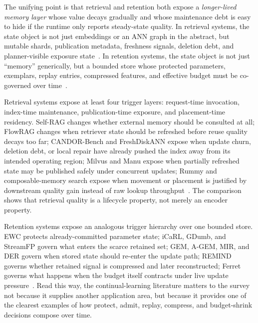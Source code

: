 The unifying point is that retrieval and retention both expose a \emph{longer-lived memory layer} whose value decays gradually and whose maintenance debt is easy to hide if the runtime only reports steady-state quality. In retrieval systems, the state object is not just embeddings or an ANN graph in the abstract, but mutable shards, publication metadata, freshness signals, deletion debt, and planner-visible exposure state~\cite{singh2021freshdiskann,wang2021milvus,guo2022manu,asai2024selfrag,zhang2026flowrag,wang2026candor}. In retention systems, the state object is not just ``memory'' generically, but a bounded store whose protected parameters, exemplars, replay entries, compressed features, and effective budget must be co-governed over time~\cite{kirkpatrick2017ewc,rebuffi2017icarl,aljundi2019mir,prabhu2020gdumb,hayes2020remind,zhou2025ferret,li2026streamfp}.

Retrieval systems expose at least four trigger layers: request-time invocation, index-time maintenance, publication-time exposure, and placement-time residency. Self-RAG changes whether external memory should be consulted at all; FlowRAG changes when retriever state should be refreshed before reuse quality decays too far; CANDOR-Bench and FreshDiskANN expose when update churn, deletion debt, or local repair have already pushed the index away from its intended operating region; Milvus and Manu expose when partially refreshed state may be published safely under concurrent updates; Rummy and composable-memory search expose when movement or placement is justified by downstream quality gain instead of raw lookup throughput~\cite{asai2024selfrag,zhang2026flowrag,wang2026candor,singh2021freshdiskann,wang2021milvus,guo2022manu,zhang2024rummy,quinn2025accelerating}. The comparison shows that retrieval quality is a lifecycle property, not merely an encoder property.

Retention systems expose an analogous trigger hierarchy over one bounded store. EWC protects already-committed parameter state; iCaRL, GDumb, and StreamFP govern what enters the scarce retained set; GEM, A-GEM, MIR, and DER govern when stored state should re-enter the update path; REMIND governs whether retained signal is compressed and later reconstructed; Ferret governs what happens when the budget itself contracts under live update pressure~\cite{kirkpatrick2017ewc,rebuffi2017icarl,prabhu2020gdumb,li2026streamfp,lopez2017gem,chaudhry2019agem,aljundi2019mir,buzzega2020der,hayes2020remind,zhou2025ferret}. Read this way, the continual-learning literature matters to the survey not because it supplies another application area, but because it provides one of the clearest examples of how protect, admit, replay, compress, and budget-shrink decisions compose over time.

